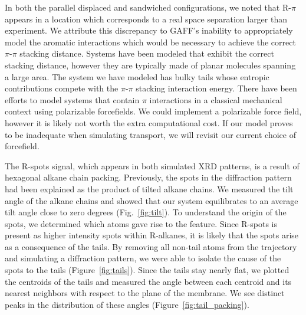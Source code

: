 \documentclass{article}
\begin{document}

  In both the parallel displaced and sandwiched configurations, we noted that
  R-$\pi$ appears in a location which corresponds to a real space separation
  larger than experiment. We attribute this discrepancy to GAFF's inability to
  appropriately model the aromatic interactions which would be necessary to
  achieve the correct $\pi$-$\pi$ stacking distance. Systems have been modeled
  that exhibit the correct stacking distance, however they are typically made of
  planar molecules spanning a large area. The system we have modeled has bulky
  tails whose entropic contributions compete with the $\pi$-$\pi$ stacking
  interaction energy.  There have been efforts to model systems that contain
  $\pi$ interactions in a classical mechanical context using polarizable
  forcefields. 
We could implement a polarizable force field, however it is likely
  not worth the extra computational cost. If our model proves to be inadequate
  when simulating transport, we will revisit our current choice of forcefield.  

  The R-spots signal, which appears in both simulated XRD patterns, is a result
  of hexagonal alkane chain packing. Previously, the spots in the diffraction
  pattern had been explained as the product of tilted alkane chains. We measured
  the tilt angle of the alkane chains and showed that our system equilibrates to
  an average tilt angle close to zero degrees (Fig.~\ref{fig:tilt}). To
  understand the origin of the spots, we determined which atoms gave rise to the
  feature. Since R-spots is present as higher intensity spots within R-alkanes,
  it is likely that the spots arise as a consequence of the tails. By removing
  all non-tail atoms from the trajectory and simulating a diffraction pattern, we
  were able to isolate the cause of the spots to the tails
  (Figure~\ref{fig:tails}). Since the tails stay nearly flat, we plotted the
  centroids of the tails and measured the angle between each centroid and its
  nearest neighbors with respect to the plane of the membrane. We see distinct
  peaks in the distribution of these angles (Figure~\ref{fig:tail_packing}).
\end{document}
